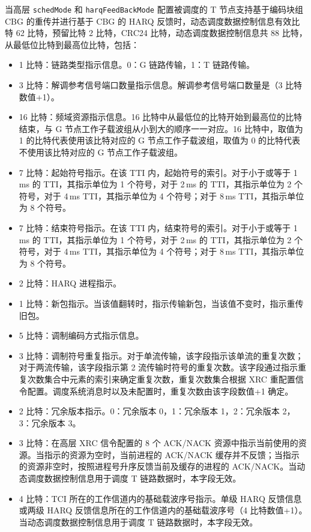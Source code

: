 \documentclass[11pt,a4paper]{ctexart}
\begin{document}
当高层 \texttt{schedMode} 和 \texttt{harqFeedBackMode} 配置被调度的 T 节点支持基于编码块组 CBG 的重传并进行基于 CBG 的 HARQ 反馈时，动态调度数据控制信息有效比特 62 比特，预留比特 2 比特，CRC24 比特，动态调度数据控制信息共 88 比特，从最低位比特到最高位比特，包括：
\begin{itemize}[nosep]
  \item 1 比特：链路类型指示信息。0：G 链路传输，1：T 链路传输。
  \item 3 比特：解调参考信号端口数量指示信息。解调参考信号端口数量是（3 比特数值+1）。
  \item 16 比特：频域资源指示信息。16 比特中从最低位的比特开始到最高位的比特结束，与 G 节点工作子载波组从小到大的顺序一一对应。16 比特中，取值为 1 的比特代表使用该比特对应的 G 节点工作子载波组，取值为 0 的比特代表不使用该比特对应的 G 节点工作子载波组。
  \item 7 比特：起始符号指示。在该 TTI 内，起始符号的索引。对于小于或等于 1\,ms 的 TTI，其指示单位为 1 个符号，对于 2\,ms 的 TTI，其指示单位为 2 个符号，对于 4\,ms TTI，其指示单位为 4 个符号；对于 8\,ms TTI，其指示单位为 8 个符号。
  \item 7 比特：结束符号指示。在该 TTI 内，结束符号的索引。对于小于或等于 1\,ms 的 TTI，其指示单位为 1 个符号，对于 2\,ms 的 TTI，其指示单位为 2 个符号，对于 4\,ms TTI，其指示单位为 4 个符号；对于 8\,ms TTI，其指示单位为 8 个符号。
  \item 2 比特：HARQ 进程指示。
  \item 1 比特：新包指示。当该值翻转时，指示传输新包，当该值不变时，指示重传旧包。
  \item 5 比特：调制编码方式指示信息。
  \item 3 比特：调制符号重复指示。对于单流传输，该字段指示该单流的重复次数；对于两流传输，该字段指示第 2 流传输时符号的重复次数。该字段通过指示重复次数集合中元素的索引来确定重复次数，重复次数集合根据 XRC 重配置信令配置。调度系统消息时以及未配置时，重复次数由该字段数值+1 确定。
  \item 2 比特：冗余版本指示。0：冗余版本 0，1：冗余版本 1，2：冗余版本 2，3：冗余版本 3。
  \item 3 比特：在高层 XRC 信令配置的 8 个 ACK/NACK 资源中指示当前使用的资源。当指示的资源为空时，当前进程的 ACK/NACK 缓存并不反馈；当指示的资源非空时，按照进程号升序反馈当前及缓存的进程的 ACK/NACK。当动态调度数据控制信息用于调度 T 链路数据时，本字段无效。
  \item 4 比特：TCI 所在的工作信道内的基础载波序号指示。单级 HARQ 反馈信息或两级 HARQ 反馈信息所在的工作信道内的基础载波序号（4 比特数值+1）。当动态调度数据控制信息用于调度 T 链路数据时，本字段无效。

\end{itemize}
\end{document}
